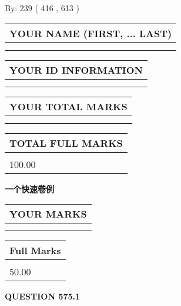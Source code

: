 \documentclass{ctexart}
\begin{document}
   
\hspace{1.0in} By: 
 239 ( 416 ,  613 )
   
   
   
   
\newpage 
\setcounter{page}{ 
   575001 } 
   
   
   
   
\noindent\begin{tabular}{|l|}
\hline
YOUR NAME (FIRST, ... LAST)  \\
\hline
 \\ 
 \\ 
\hline
\end{tabular}
\hspace{0.05in} \begin{tabular}{|l|}
\hline
 YOUR   ID   INFORMATION  \\
\hline
 \\ 
 \\ 
\hline
\end{tabular}
   
   
\vspace{0.2in}\noindent\begin{tabular}{|l|}
\hline
YOUR TOTAL MARKS  \\
\hline
 \\ 
 \\ 
\hline
\end{tabular}
\hspace{0.05in} \begin{tabular}{|l|}
\hline
TOTAL FULL MARKS  \\
\hline
 \\ 
100.00 \\
\hline
\end{tabular}
   
   
 \vspace{0.2in}
{\LARGE {\textbf{ 一个快速卷例}}}
   
   
  
\vspace{0.2in}
  
\noindent\begin{tabular}{|l|}
\hline
 YOUR MARKS  \\
\hline
 \\ 
 \\ 
\hline
\end{tabular}
\hspace{0.05in} \begin{tabular}{|l|}
\hline
 Full Marks  \\
\hline
 \\ 
50.00 \\
\hline
\end{tabular}
{\textbf{\Large{QUESTION
575.1 
}}}
  
\end{document}
